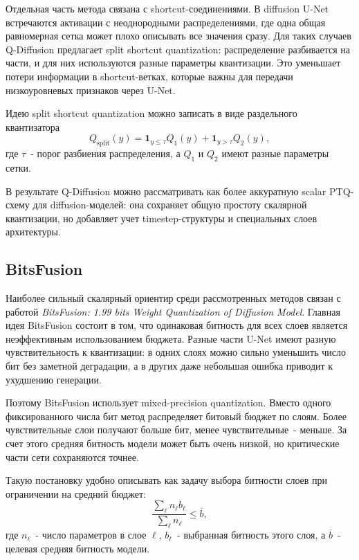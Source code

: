 \documentclass[a4paper,12pt]{article}
\begin{document}
Отдельная часть метода связана с shortcut-соединениями. В diffusion U-Net встречаются активации с неоднородными распределениями, где одна общая равномерная сетка может плохо описывать все значения сразу. Для таких случаев Q-Diffusion предлагает split shortcut quantization: распределение разбивается на части, и для них используются разные параметры квантизации. Это уменьшает потери информации в shortcut-ветках, которые важны для передачи низкоуровневых признаков через U-Net.

Идею split shortcut quantization можно записать в виде раздельного квантизатора
\[
    Q_{\mathrm{split}}(y)
    =
    \mathbf{1}_{y \le \tau} Q_1(y)
    +
    \mathbf{1}_{y > \tau} Q_2(y),
\]
где $\tau$~- порог разбиения распределения, а $Q_1$ и $Q_2$ имеют разные параметры сетки.

В результате Q-Diffusion можно рассматривать как более аккуратную scalar PTQ-схему для diffusion-моделей: она сохраняет общую простоту скалярной квантизации, но добавляет учет timestep-структуры и специальных слоев архитектуры.

\subsection{BitsFusion}

Наиболее сильный скалярный ориентир среди рассмотренных методов связан с работой \textit{BitsFusion: 1.99 bits Weight Quantization of Diffusion Model}. Главная идея BitsFusion состоит в том, что одинаковая битность для всех слоев является неэффективным использованием бюджета. Разные части U-Net имеют разную чувствительность к квантизации: в одних слоях можно сильно уменьшить число бит без заметной деградации, а в других даже небольшая ошибка приводит к ухудшению генерации.

Поэтому BitsFusion использует mixed-precision quantization. Вместо одного фиксированного числа бит метод распределяет битовый бюджет по слоям. Более чувствительные слои получают больше бит, менее чувствительные~- меньше. За счет этого средняя битность модели может быть очень низкой, но критические части сети сохраняются точнее.

Такую постановку удобно описывать как задачу выбора битности слоев при ограничении на средний бюджет:
\[
    \frac{\sum_{\ell} n_{\ell} b_{\ell}}{\sum_{\ell} n_{\ell}}
    \le \overline{b},
\]
где $n_{\ell}$~- число параметров в слое $\ell$, $b_{\ell}$~- выбранная битность этого слоя, а $\overline{b}$~- целевая средняя битность модели.
\end{document}
